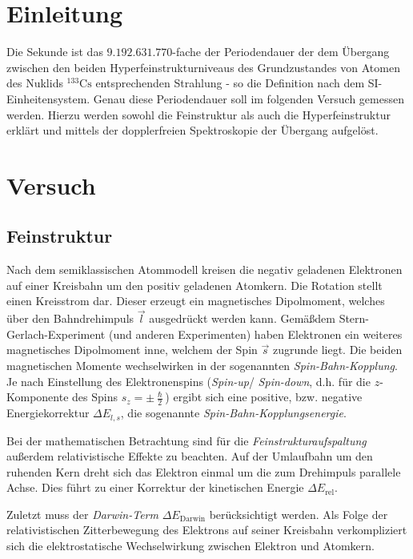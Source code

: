 \documentclass[../bericht.tex]{subfiles}
\begin{document}
  \chapter{Einleitung}

    Die Sekunde ist das $9.192.631.770$-fache der Periodendauer der dem \"Ubergang zwischen den beiden Hyperfeinstrukturniveaus des Grundzustandes von Atomen des Nuklids $\mathrm{^{133}Cs}$ entsprechenden Strahlung - so die Definition nach dem SI-Einheitensystem. Genau diese Periodendauer soll im folgenden Versuch gemessen werden. Hierzu werden sowohl die Feinstruktur als auch die Hyperfeinstruktur erkl\"art und mittels der dopplerfreien Spektroskopie der \"Ubergang aufgel\"ost.


  \chapter{Versuch}

    \section{Feinstruktur}
    \label{sec:feinstruktur}

      Nach dem semiklassischen Atommodell kreisen die negativ geladenen Elektronen auf einer Kreisbahn um den positiv geladenen Atomkern. Die Rotation stellt einen Kreisstrom dar. Dieser erzeugt ein magnetisches Dipolmoment, welches \"uber den Bahndrehimpuls $\vec{l}$ ausgedr\"uckt werden kann. Gem\"a\ss dem Stern-Gerlach-Experiment (und anderen Experimenten) haben Elektronen ein weiteres magnetisches Dipolmoment inne, welchem der Spin $\vec{s}$ zugrunde liegt. Die beiden magnetischen Momente wechselwirken in der sogenannten \textit{Spin-Bahn-Kopplung}. Je nach Einstellung des Elektronenspins (\textit{Spin-up}/ \textit{Spin-down}, d.h. f\"ur die $z$-Komponente des Spins $s_z=\pm \frac{\hslash}{2}$) ergibt sich eine positive, bzw. negative Energiekorrektur $\Delta E_{l,s}$, die sogenannte \textit{Spin-Bahn-Kopplungsenergie}.

      Bei der mathematischen Betrachtung sind f\"ur die \textit{Feinstrukturaufspaltung} au\ss{}erdem relativistische Effekte zu beachten. Auf der Umlaufbahn um den ruhenden Kern dreht sich das Elektron einmal um die zum Drehimpuls parallele Achse. Dies f\"uhrt zu einer Korrektur der kinetischen Energie $\Delta E_\mathrm{rel}$.

      Zuletzt muss der \textit{Darwin-Term} $\Delta E_\mathrm{Darwin}$ ber\"ucksichtigt werden. Als Folge der relativistischen Zitterbewegung des Elektrons auf seiner Kreisbahn verkompliziert sich die elektrostatische Wechselwirkung zwischen Elektron und Atomkern.
      \medskip
\end{document}
